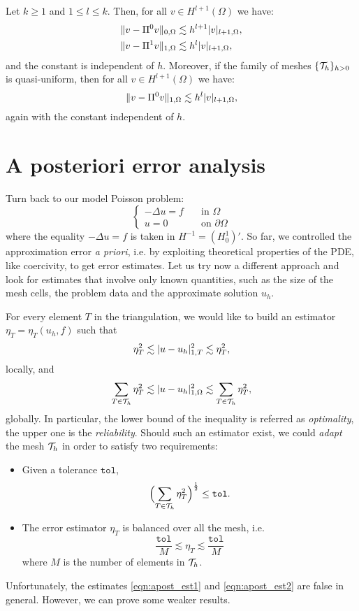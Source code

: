 \begin{lemma}
    Let $k\ge1$ and $1\le l \le k$. Then, for all $v \in H^{l+1}(\Omega)$ we have:
    \begin{align}
        \lVert v - \Pi^0 v\rVert_{0,\Omega} &\lesssim h^{l+1} \lvert v\rvert_{l+1,\Omega}, \\
        \lVert v - \Pi^1 v\rVert_{1,\Omega} &\lesssim h^l \lvert v\rvert_{l+1,\Omega},
    \end{align}
    and the constant is independent of $h$. Moreover, if the family of meshes $\{\mathcal{T}_h\}_{h>0}$ is quasi-uniform, then for all $v \in H^{l+1}(\Omega)$ we have:
    \[
        \lVert v - \Pi^0 v\rVert_{1,\Omega} \lesssim h^l \lvert v\rvert_{l+1,\Omega},
    \]
    again with the constant independent of $h$.
\end{lemma}


\section{A posteriori error analysis}

Turn back to our model Poisson problem:
\[
\begin{cases}
    -\Delta u = f \quad &\text{in } \Omega \\
    u = 0 \quad &\text{on } \partial\Omega
\end{cases}
\]
where the equality $-\Delta u = f$ is taken in $H^{-1}=(H^1_0)'$. So far, we controlled the approximation error \emph{a priori}, i.e. by exploiting theoretical properties of the PDE, like coercivity, to get error estimates. Let us try now a different approach and look for estimates that involve only known quantities, such as the size of the mesh cells, the problem data and the approximate solution $u_h$.

For every element $T$ in the triangulation, we would like to build an estimator $\eta_T = \eta_T(u_h, f)$ such that
\begin{equation}\label{eqn:apost_est1}
    \eta_T^2 \lesssim \lvert u - u_h\rvert_{1,T}^2 \lesssim \eta_T^2,
\end{equation}
locally, and
\begin{equation}\label{eqn:apost_est2}
\sum_{T \in \mathcal{T}_h} \eta_T^2 \lesssim \lvert u - u_h\rvert_{1,\Omega}^2 \lesssim \sum_{T \in \mathcal{T}_h} \eta_T^2,
\end{equation}
globally. In particular, the lower bound of the inequality is referred as \emph{optimality}, the upper one is the \emph{reliability}.
Should such an estimator exist, we could \emph{adapt} the mesh $\mathcal{T}_h$ in order to satisfy two requirements:
\begin{itemize}
    \item Given a tolerance $\texttt{tol}$,
    \[
    \Bigl( \sum_{T \in \mathcal{T}_h} \eta_T^2 \Bigr)^\frac{1}{2} \le \texttt{tol}.
    \]
    \item The error estimator $\eta_T$ is balanced over all the mesh, i.e.
    \[
    \frac{\texttt{tol}}{M} \lesssim \eta_T \lesssim \frac{\texttt{tol}}{M}
    \]
    where $M$ is the number of elements in $\mathcal{T}_h$.
\end{itemize}
Unfortunately, the estimates \eqref{eqn:apost_est1} and \eqref{eqn:apost_est2} are false in general. However, we can prove some weaker results.

